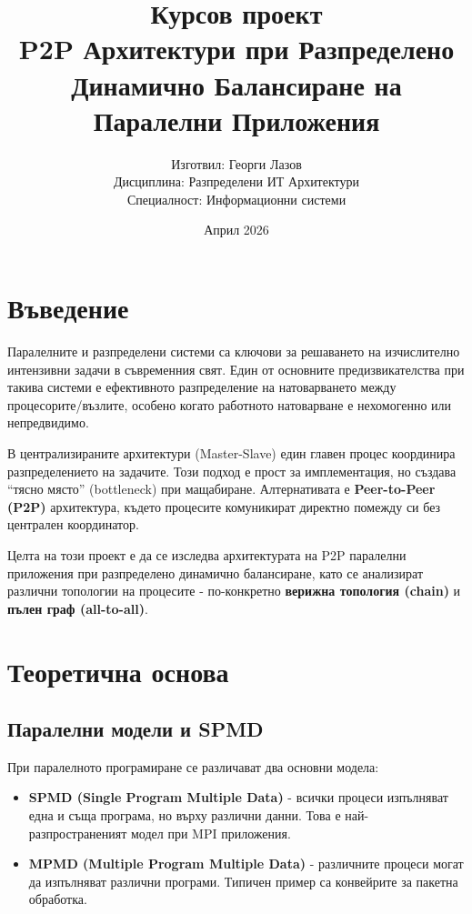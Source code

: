 \documentclass[12pt,a4paper]{article}
\title{
    \vspace{2cm}
    \textbf{Курсов проект} \\
    \vspace{1cm}
    \Large{P2P Архитектури при Разпределено Динамично Балансиране на Паралелни Приложения}
}
\author{
    Изготвил: Георги Лазов \\
    Дисциплина: Разпределени ИТ Архитектури \\
    Специалност: Информационни системи
}
\date{Април 2026}
\begin{document}
\maketitle
\newpage

\tableofcontents
\newpage

\section{Въведение}

Паралелните и разпределени системи са ключови за решаването на изчислително интензивни задачи в съвременния свят. Един от основните предизвикателства при такива системи е ефективното разпределение на натоварването между процесорите/възлите, особено когато работното натоварване е нехомогенно или непредвидимо.

В централизираните архитектури (Master-Slave) един главен процес координира разпределението на задачите. Този подход е прост за имплементация, но създава ``тясно място'' (bottleneck) при мащабиране. Алтернативата е \textbf{Peer-to-Peer (P2P)} архитектура, където процесите комуникират директно помежду си без централен координатор.

Целта на този проект е да се изследва архитектурата на P2P паралелни приложения при разпределено динамично балансиране, като се анализират различни топологии на процесите - по-конкретно \textbf{верижна топология (chain)} и \textbf{пълен граф (all-to-all)}.

\section{Теоретична основа}

\subsection{Паралелни модели и SPMD}

При паралелното програмиране се различават два основни модела:

\begin{itemize}
    \item \textbf{SPMD (Single Program Multiple Data)} - всички процеси изпълняват една и съща програма, но върху различни данни. Това е най-разпространеният модел при MPI приложения.
    \item \textbf{MPMD (Multiple Program Multiple Data)} - различните процеси могат да изпълняват различни програми. Типичен пример са конвейрите за пакетна обработка.
\end{itemize}
\end{document}
